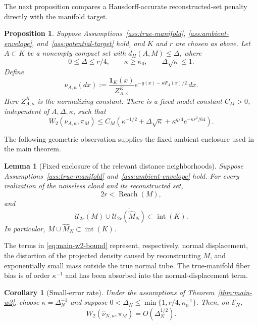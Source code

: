 \documentclass{article}
\newtheorem{proposition}{Proposition}
\newtheorem{lemma}{Lemma}
\newtheorem{corollary}{Corollary}
\newcommand{\Reach}{\operatorname{Reach}}
\newcommand{\cE}{\mathcal E}
\newcommand{\cU}{\mathcal U}
\newcommand{\wideM}{\widehat M_N}
\newcommand{\whatnu}{\widehat\nu_{N,\kappa}}
\numberwithin{equation}{section}
\begin{document}
The next proposition compares a Hausdorff-accurate reconstructed-set
penalty directly with the manifold target.
\begin{proposition}
\label{prop:true-penalty}
Suppose Assumptions~\ref{ass:true-manifold},
\ref{ass:ambient-envelope}, and~\ref{ass:potential-target} hold, and $K$
and $r$ are chosen as above. Let $A\subset K$ be a nonempty compact set
with $d_H(A,M)\le\Delta$, where
\[
 0\le\Delta\le r/4,
 \qquad \kappa\ge\kappa_0,
 \qquad \Delta\sqrt\kappa\le1.
\]
Define
\[
 \nu_{A,\kappa}(dx)
 :=\frac{\mathbf1_K(x)}{Z_{A,\kappa}^K}
 e^{-g(x)-\kappa\Psi_A(x)/2}\,dx.
\]
Here $Z_{A,\kappa}^K$ is the normalizing constant.
There is a fixed-model constant $C_M>0$, independent of $A,\Delta,\kappa$,
such that
\begin{equation}
 W_2(\nu_{A,\kappa},\pi_M)
 \le C_M\left(
 \kappa^{-1/2}+\Delta\sqrt\kappa
 +\kappa^{q/4}e^{-\kappa r^2/64}
 \right).
\label{eq:true-penalty-bound}
\end{equation}
\end{proposition}



The following geometric observation supplies the fixed ambient enclosure
used in the main theorem.
\begin{lemma}[Fixed enclosure of the relevant distance neighborhoods]
\label{lem:common-tubes-on-event}
Suppose Assumptions~\ref{ass:true-manifold}
and~\ref{ass:ambient-envelope} hold. For every realization of the noiseless
cloud and its reconstructed set,
\[
  2r<\Reach(M),
\]
and
\begin{equation}
  \overline{\cU_{2r}(M)}
  \cup
  \overline{\cU_{2r}(\wideM)}
  \subset\operatorname{int}(K).
\label{eq:automatic-complete-tubes}
\end{equation}
In particular, $M\cup\wideM\subset\operatorname{int}(K)$.
\end{lemma}



The terms in \eqref{eq:main-w2-bound} represent, respectively,
normal displacement, the distortion of the projected density caused
by reconstructing $M$, and exponentially small mass outside the true
normal tube. The true-manifold fiber bias is of order $\kappa^{-1}$
and has been absorbed into the normal-displacement term.

\begin{corollary}[Small-error rate]
\label{cor:optimized}
Under the assumptions of Theorem~\ref{thm:main-w2}, choose
$\kappa=\Delta_N^{-1}$ and suppose
$0<\Delta_N\le\min\{1,r/4,\kappa_0^{-1}\}$.
Then, on $\cE_N$,
\begin{equation}
 W_2(\whatnu,\pi_M)=O(\Delta_N^{1/2}).
\label{eq:Delta-half}
\end{equation}
\end{corollary}
\end{document}
